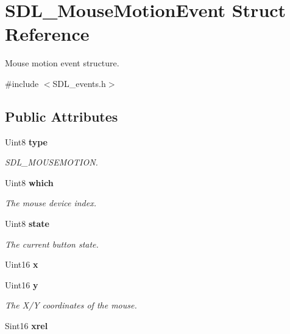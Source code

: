 \section{S\+D\+L\+\_\+\+Mouse\+Motion\+Event Struct Reference}
\label{struct_s_d_l___mouse_motion_event}


Mouse motion event structure.  




{\ttfamily \#include $<$S\+D\+L\+\_\+events.\+h$>$}

\subsection*{Public Attributes}
\begin{DoxyCompactItemize}
\item 
Uint8 {\bf type}\label{struct_s_d_l___mouse_motion_event_ab5d4d8bef3b1a6f34429024b7aecf682}

\begin{DoxyCompactList}\small\item\em S\+D\+L\+\_\+\+M\+O\+U\+S\+E\+M\+O\+T\+I\+O\+N. \end{DoxyCompactList}\item 
Uint8 {\bf which}\label{struct_s_d_l___mouse_motion_event_a7ea0004baf91d3b4572cdaadd35474c5}

\begin{DoxyCompactList}\small\item\em The mouse device index. \end{DoxyCompactList}\item 
Uint8 {\bf state}\label{struct_s_d_l___mouse_motion_event_a10434904d352c7165b9de5685d10dda6}

\begin{DoxyCompactList}\small\item\em The current button state. \end{DoxyCompactList}\item 
Uint16 {\bfseries x}\label{struct_s_d_l___mouse_motion_event_abf5b246feb0afbcabcef22b924eda8c3}

\item 
Uint16 {\bf y}\label{struct_s_d_l___mouse_motion_event_ac7d0f0463c27e6d8e154efe5cc6c1897}

\begin{DoxyCompactList}\small\item\em The X/\+Y coordinates of the mouse. \end{DoxyCompactList}\item 
Sint16 {\bf xrel}\label{struct_s_d_l___mouse_motion_event_a84d307cc7d52073852497d8846f0a7c5}


\end{DoxyCompactItemize}
